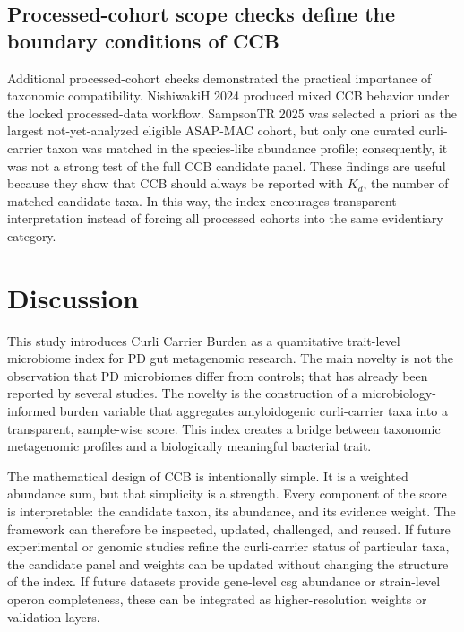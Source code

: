 \documentclass[11pt]{article}
\begin{document}
\subsection*{Processed-cohort scope checks define the boundary conditions of CCB}

Additional processed-cohort checks demonstrated the practical importance of taxonomic compatibility. NishiwakiH 2024 produced mixed CCB behavior under the locked processed-data workflow. SampsonTR 2025 was selected a priori as the largest not-yet-analyzed eligible ASAP-MAC cohort, but only one curated curli-carrier taxon was matched in the species-like abundance profile; consequently, it was not a strong test of the full CCB candidate panel. These findings are useful because they show that CCB should always be reported with $K_d$, the number of matched candidate taxa. In this way, the index encourages transparent interpretation instead of forcing all processed cohorts into the same evidentiary category.

\section*{Discussion}

This study introduces Curli Carrier Burden as a quantitative trait-level microbiome index for PD gut metagenomic research. The main novelty is not the observation that PD microbiomes differ from controls; that has already been reported by several studies. The novelty is the construction of a microbiology-informed burden variable that aggregates amyloidogenic curli-carrier taxa into a transparent, sample-wise score. This index creates a bridge between taxonomic metagenomic profiles and a biologically meaningful bacterial trait.

The mathematical design of CCB is intentionally simple. It is a weighted abundance sum, but that simplicity is a strength. Every component of the score is interpretable: the candidate taxon, its abundance, and its evidence weight. The framework can therefore be inspected, updated, challenged, and reused. If future experimental or genomic studies refine the curli-carrier status of particular taxa, the candidate panel and weights can be updated without changing the structure of the index. If future datasets provide gene-level csg abundance or strain-level operon completeness, these can be integrated as higher-resolution weights or validation layers.
\end{document}
